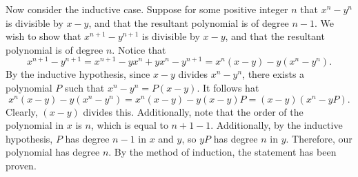 \documentclass[11pt, letterpaper]{report}
\begin{document}
Now consider the inductive case. Suppose for some positive integer $n$ that $x^n-y^n$ is divisible by $x-y$, and that the resultant polynomial is of degree $n-1$. We wish to show that $x^{n+1}-y^{n+1}$ is divisible by $x-y$, and that the resultant polynomial is of degree $n$. Notice that
\[
	x^{n+1}-y^{n+1}=x^{n+1}-yx^{n}+yx^{n}-y^{n+1}=x^n(x-y)-y\left( x^n-y^n \right) 
.\]
By the inductive hypothesis, since $x-y$ divides $x^n-y^n$, there exists a polynomial $P$ such that $x^n-y^n=P(x-y)$. It follows hat
\[
	x^n(x-y)-y\left( x^n-y^n \right) =x^n(x-y)-y(x-y)P=(x-y)\left( x^n-yP \right) 
.\]
Clearly, $(x-y)$ divides this. Additionally, note that the order of the polynomial in $x$ is $n$, which is equal to $n+1-1$. Additionally, by the inductive hypothesis, $P$ has degree $n-1$ in $x$ and $y$, so $yP$ has degree $n$ in $y$. Therefore, our polynomial has degree $n$. By the method of induction, the statement has been proven.
\end{document}
